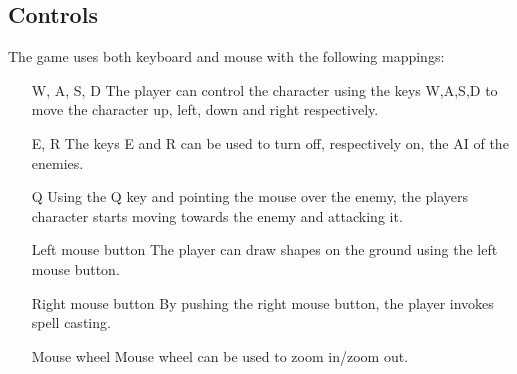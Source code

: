 \subsection{Controls}
The game uses both keyboard and mouse with the following mappings:
\begin{itemize}
\item[W, A, S, D] The player can control the character using the keys W,A,S,D to move the character up, left, down and right respectively.
\item[E, R] The keys E and R can be used to turn off, respectively on, the AI of the enemies.
\item[Q] Using the Q key and pointing the mouse over the enemy, the players character starts moving towards the enemy and attacking it.
\item[Left mouse button] The player can draw shapes on the ground using the left mouse button.
\item[Right mouse button] By pushing the right mouse button, the player invokes spell casting.
\item[Mouse wheel] Mouse wheel can be used to zoom in/zoom out.
\end{itemize}

